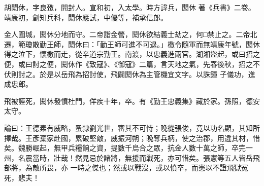 \begin{pinyinscope}
 胡閎休，字良㢸，開封人。宣和初，入太學。時方諱兵，閎休
 著《兵書》二卷。靖康初，創知兵科，閎休應試，中優等，補承信郎。



 金人圍城，閎休分地而守。二帝詣金營，閎休欲結義士劫之，何□禁止之。二帝北遷，範瓊散勤王師，閎休曰：「勤王師可進不可退。」檄令隨軍而無靖康年號，閎休得之泣下，懷檄而走，從辛道宗勤王。南渡，以忠義進兩官。湖湘盜起，或曰招之便，或曰討之便，閎休作《致寇》、《御寇》二篇，言天地之氣，先春後秋，招之不伏則討之。於是以岳飛為招討使，飛闢閎休為主管機宜文字。以誅鐘
 子儀功，進成忠郎。



 飛被誣死，閎休發憤杜門，佯疾十年，卒。有《勤王忠義集》藏於家。孫照，德安太守。



 論曰：王德素有威略，蚤隸劉光世，審其不可恃；晚從張俊，竟以功名顯，其知所擇哉。王彥棄家赴國，累破堅敵，威振河朔；晚奪兵柄，使之治郡，用違其材，惜矣。魏勝崛起，無甲兵糧餉之資，提數千烏合之眾，抗金人數十萬之師，卒完一州，名震當時，壯哉！然見忌於諸將，無援而戰死，亦可惜矣。張憲等五人皆岳飛部將，為敵所畏，亦
 一時之傑也；然或以戰沒，或以憤卒，而憲以不證飛獄冤死，悲夫！



\end{pinyinscope}